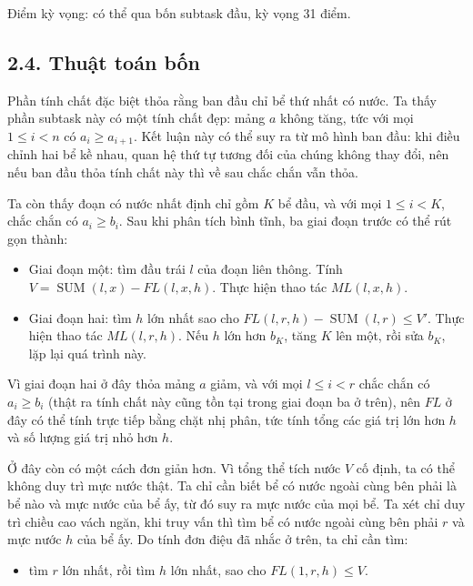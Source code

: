 \documentclass[11pt]{article}
\DeclareMathOperator{\SUM}{SUM}
\begin{document}
Điểm kỳ vọng: có thể qua bốn subtask đầu, kỳ vọng 31 điểm.

\subsection*{2.4. Thuật toán bốn}

Phần tính chất đặc biệt thỏa rằng ban đầu chỉ bể thứ nhất có nước. Ta thấy
phần subtask này có một tính chất đẹp: mảng \(a\) không tăng, tức với mọi
\(1\le i<n\) có \(a_i\ge a_{i+1}\). Kết luận này có thể suy ra từ mô hình ban
đầu: khi điều chỉnh hai bể kề nhau, quan hệ thứ tự tương đối của chúng không
thay đổi, nên nếu ban đầu thỏa tính chất này thì về sau chắc chắn vẫn thỏa.

Ta còn thấy đoạn có nước nhất định chỉ gồm \(K\) bể đầu, và với mọi
\(1\le i<K\), chắc chắn có \(a_i\ge b_i\). Sau khi phân tích bình tĩnh, ba
giai đoạn trước có thể rút gọn thành:

\begin{itemize}
  \item Giai đoạn một: tìm đầu trái \(l\) của đoạn liên thông. Tính
        \(V=\SUM(l,x)-FL(l,x,h)\). Thực hiện thao tác \(ML(l,x,h)\).
  \item Giai đoạn hai: tìm \(h\) lớn nhất sao cho
        \(FL(l,r,h)-\SUM(l,r)\le V'\). Thực hiện thao tác \(ML(l,r,h)\). Nếu
        \(h\) lớn hơn \(b_K\), tăng \(K\) lên một, rồi sửa \(b_K\), lặp lại
        quá trình này.
\end{itemize}

Vì giai đoạn hai ở đây thỏa mảng \(a\) giảm, và với mọi \(l\le i<r\) chắc
chắn có \(a_i\ge b_i\) (thật ra tính chất này cũng tồn tại trong giai đoạn ba
ở trên), nên \(FL\) ở đây có thể tính trực tiếp bằng chặt nhị phân, tức tính
tổng các giá trị lớn hơn \(h\) và số lượng giá trị nhỏ hơn \(h\).

Ở đây còn có một cách đơn giản hơn. Vì tổng thể tích nước \(V\) cố định, ta
có thể không duy trì mực nước thật. Ta chỉ cần biết bể có nước ngoài cùng bên
phải là bể nào và mực nước của bể ấy, từ đó suy ra mực nước của mọi bể. Ta
xét chỉ duy trì chiều cao vách ngăn, khi truy vấn thì tìm bể có nước ngoài
cùng bên phải \(r\) và mực nước \(h\) của bể ấy. Do tính đơn điệu đã nhắc ở
trên, ta chỉ cần tìm:

\begin{itemize}
  \item tìm \(r\) lớn nhất, rồi tìm \(h\) lớn nhất, sao cho
        \(FL(1,r,h)\le V\).
\end{itemize}
\end{document}
